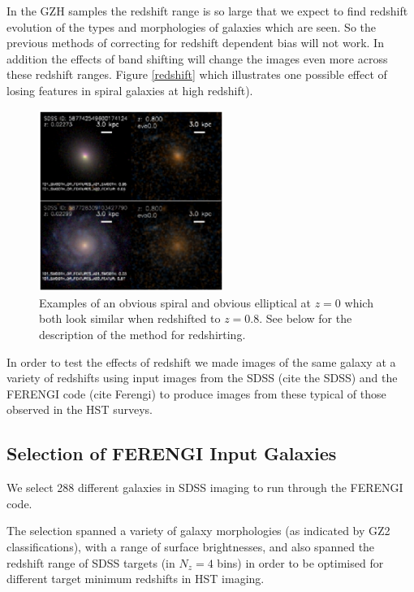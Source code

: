 \documentclass[usenatbib]{mn2e}
\begin{document}
In the GZH samples the redshift range is so large that we expect to find redshift evolution of the types and morphologies of galaxies which are seen. So the previous methods of correcting for redshift dependent bias will not work. In addition the effects of band shifting will change the images even more across these redshift ranges. Figure \ref{redshift} which illustrates one possible effect of losing features in spiral galaxies at high redshift). 

\begin{figure}
\begin{center}
\includegraphics[width=60mm]{example_ferengi2.ps}
\caption{Examples of an obvious spiral and obvious elliptical at $z=0$ which both look similar when redshifted to $z=0.8$. See below for the description of the method for redshirting.  \label{exampleFERENGI}}
\end{center}
\end{figure}

In order to test the effects of redshift we made images of the same galaxy at a variety of redshifts using input images from the SDSS (cite the SDSS) and the FERENGI code (cite Ferengi) to produce images from these typical of those observed in the HST surveys. 
 
\subsection{Selection of FERENGI Input Galaxies}

We select 288 different galaxies in SDSS imaging to run through the FERENGI code.

The selection spanned a variety of galaxy morphologies (as indicated by GZ2 classifications), with a range of surface brightnesses, and also spanned the redshift range of SDSS targets (in $N_z = 4$ bins) in order to be optimised for different target minimum redshifts in HST imaging. 
\end{document}
